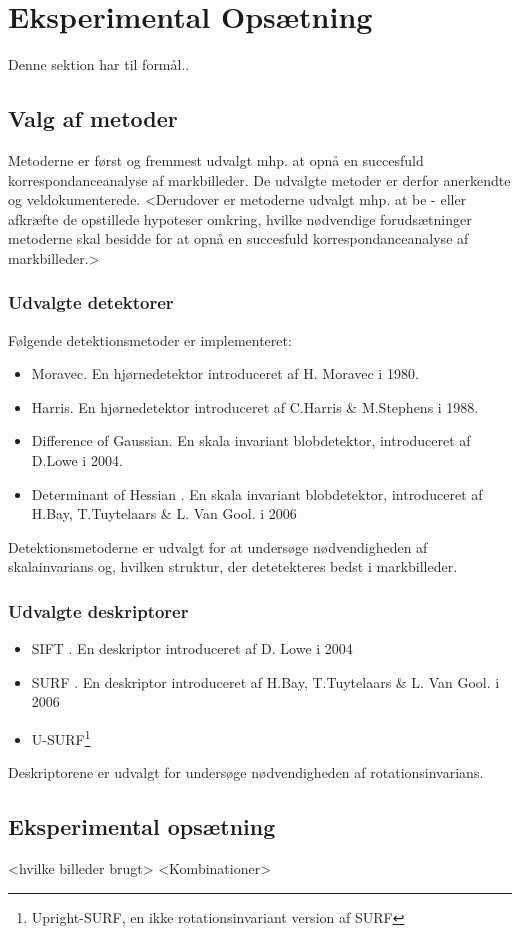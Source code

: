 \chapter{Eksperimental Opsætning}
Denne sektion har til formål..
\section{Valg af metoder}
Metoderne er først og fremmest udvalgt mhp. at opnå en succesfuld korrespondanceanalyse af markbilleder. De udvalgte metoder er derfor anerkendte og veldokumenterede. <Derudover er metoderne udvalgt mhp. at be - eller afkræfte de opstillede hypoteser omkring, hvilke nødvendige forudsætninger metoderne skal besidde for at opnå en succesfuld korrespondanceanalyse af markbilleder.>
\subsection{Udvalgte detektorer}
Følgende detektionsmetoder er implementeret:
\begin{itemize}
\item{Moravec\cite{moravec}. En hjørnedetektor introduceret af H. Moravec i 1980.}
\item{Harris\cite{harris}. En hjørnedetektor introduceret af C.Harris \& M.Stephens i 1988.}
\item{Difference of Gaussian\cite{SIFT}. En skala invariant blobdetektor, introduceret af D.Lowe i 2004.}
\item{Determinant of Hessian \cite{SURF}. En skala invariant blobdetektor, introduceret af H.Bay, T.Tuytelaars \& L. Van Gool. i 2006}
\end{itemize}
Detektionsmetoderne er udvalgt for at undersøge nødvendigheden af skalainvarians og, hvilken struktur, der detetekteres bedst i markbilleder.
\subsection{Udvalgte deskriptorer}
\begin{itemize}
\item{SIFT \cite{SIFT}. En deskriptor introduceret af D. Lowe i 2004}
\item{SURF \cite{SURF}. En deskriptor introduceret af  H.Bay, T.Tuytelaars \& L. Van Gool. i 2006}
\item{U-SURF\footnote{Upright-SURF, en ikke rotationsinvariant version af SURF}} 
\end{itemize}
Deskriptorene er udvalgt for undersøge nødvendigheden af rotationsinvarians.
\section{Eksperimental opsætning}
<hvilke billeder brugt>
<Kombinationer>